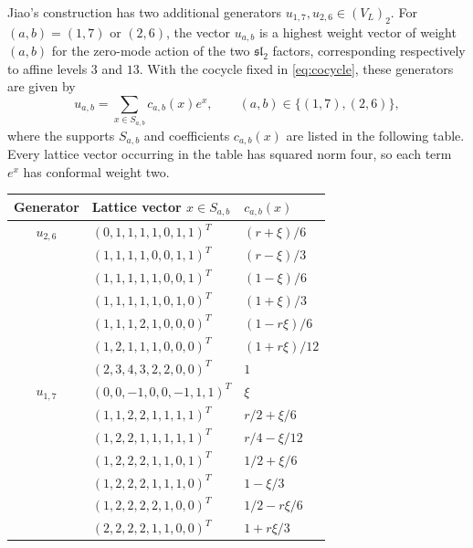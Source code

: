 \documentclass[11pt,reqno]{amsart}
\theoremstyle{definition}\newtheorem{definition}[theorem]{Definition}
\theoremstyle{remark}\newtheorem{remark}[theorem]{Remark}
\numberwithin{equation}{section}
\begin{document}
Jiao's construction has two additional generators
$u_{1,7},u_{2,6}\in (V_L)_2$.
For $(a,b)=(1,7)$ or $(2,6)$, the vector $u_{a,b}$ is a
highest weight vector of weight $(a,b)$ for the zero-mode action
of the two $\mathfrak{sl}_2$ factors, corresponding respectively
to affine levels $3$ and $13$.
With the cocycle fixed in \eqref{eq:cocycle}, these generators
are given by
\[
 u_{a,b}=\sum_{x\in S_{a,b}}c_{a,b}(x)e^x,
 \qquad (a,b)\in\{(1,7),(2,6)\},
\]
where the supports $S_{a,b}$ and coefficients $c_{a,b}(x)$
are listed in the following table.
Every lattice vector occurring in the table has squared norm
four, so each term $e^x$ has conformal weight two.

\begin{center}\small
\begin{tabular}{cll}\toprule
Generator & Lattice vector $x\in S_{a,b}$ & $c_{a,b}(x)$\\\midrule
$u_{2,6}$ & $(0,1,1,1,1,0,1,1)^T$ & $(r+\xi )/6$\\
& $(1,1,1,1,0,0,1,1)^T$ & $(r-\xi )/3$\\
& $(1,1,1,1,1,0,0,1)^T$ & $(1-\xi )/6$\\
& $(1,1,1,1,1,0,1,0)^T$ & $(1+\xi )/3$\\
& $(1,1,1,2,1,0,0,0)^T$ & $(1-r\xi )/6$\\
& $(1,2,1,1,1,0,0,0)^T$ & $(1+r\xi )/12$\\
& $(2,3,4,3,2,2,0,0)^T$ & $1$\\\midrule
$u_{1,7}$ & $(0,0,-1,0,0,-1,1,1)^T$ & $\xi$\\
& $(1,1,2,2,1,1,1,1)^T$ & $r/2+\xi /6$\\
& $(1,2,2,1,1,1,1,1)^T$ & $r/4-\xi /12$\\
& $(1,2,2,2,1,1,0,1)^T$ & $1/2+\xi /6$\\
& $(1,2,2,2,1,1,1,0)^T$ & $1-\xi /3$\\
& $(1,2,2,2,2,1,0,0)^T$ & $1/2-r\xi /6$\\
& $(2,2,2,2,1,1,0,0)^T$ & $1+r\xi /3$\\\bottomrule
\end{tabular}
\end{center}
\end{document}
